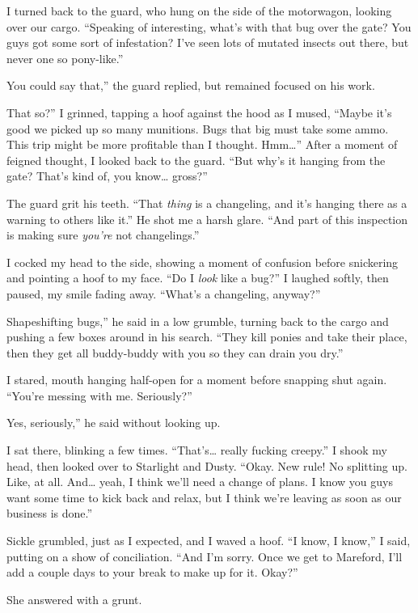 I turned back to the guard, who hung on the side of the motorwagon, looking over our cargo. “Speaking of interesting, what’s with that bug over the gate? You guys got some sort of infestation? I’ve seen lots of mutated insects out there, but never one so pony-like.”

\leavevmode{}You could say that,” the guard replied, but remained focused on his work.

\leavevmode{}That so?” I grinned, tapping a hoof against the hood as I mused, “Maybe it’s good we picked up so many munitions. Bugs that big must take some ammo. This trip might be more profitable than I thought. Hmm…” After a moment of feigned thought, I looked back to the guard. “But why’s it hanging from the gate? That’s kind of, you know… gross?”

The guard grit his teeth. “That \textit{thing} is a changeling, and it’s hanging there as a warning to others like it.” He shot me a harsh glare. “And part of this inspection is making sure \textit{you’re} not changelings.”

I cocked my head to the side, showing a moment of confusion before snickering and pointing a hoof to my face. “Do I \textit{look} like a bug?” I laughed softly, then paused, my smile fading away. “What’s a changeling, anyway?”

\leavevmode{}Shapeshifting bugs,” he said in a low grumble, turning back to the cargo and pushing a few boxes around in his search. “They kill ponies and take their place, then they get all buddy-buddy with you so they can drain you dry.”

I stared, mouth hanging half-open for a moment before snapping shut again. “You’re messing with me. Seriously?”

\leavevmode{}Yes, seriously,” he said without looking up.

I sat there, blinking a few times. “That’s… really fucking creepy.” I shook my head, then looked over to Starlight and Dusty. “Okay. New rule! No splitting up. Like, at all. And… yeah, I think we’ll need a change of plans. I know you guys want some time to kick back and relax, but I think we’re leaving as soon as our business is done.”

Sickle grumbled, just as I expected, and I waved a hoof. “I know, I know,” I said, putting on a show of conciliation. “And I’m sorry. Once we get to Mareford, I’ll add a couple days to your break to make up for it. Okay?”

She answered with a grunt.

